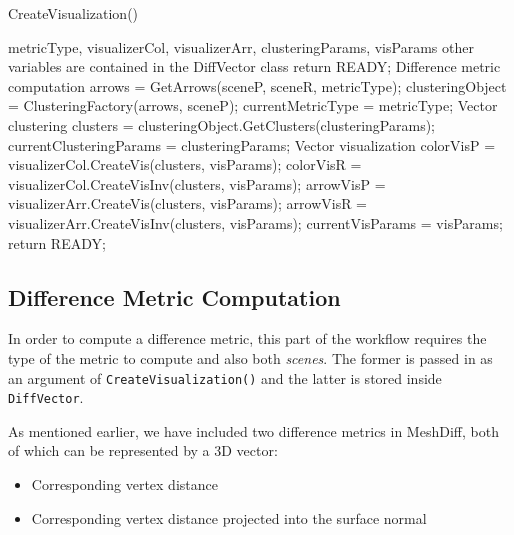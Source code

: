 \begin{algorithm}[H]
\caption{CreateVisualization()}
\label{algo:create_vis}
\begin{algorithmic}[1]

\Require metricType, visualizerCol, visualizerArr, clusteringParams, visParams \Comment other variables are contained in the DiffVector class
\Statex
{}
	\State return READY;
\EndIf
\Statex \Comment Difference metric computation
	\State arrows = GetArrows(sceneP, sceneR, metricType);
    \State clusteringObject = ClusteringFactory(arrows, sceneP);
    \State currentMetricType = metricType;
\EndIf
\Statex \Comment Vector clustering
\State clusters = clusteringObject.GetClusters(clusteringParams);
\State currentClusteringParams = clusteringParams;
\Statex \Comment Vector visualization
	\State colorVisP = visualizerCol.CreateVis(clusters, visParams);
    \State colorVisR = visualizerCol.CreateVisInv(clusters, visParams);
\EndIf
{}
	\State arrowVisP = visualizerArr.CreateVis(clusters, visParams);
    \State arrowVisR = visualizerArr.CreateVisInv(clusters, visParams);
\EndIf
\State currentVisParams = visParams;
\Statex
\State return READY;
\end{algorithmic}
\end{algorithm}

\subsection{Difference Metric Computation}
\label{sec:analysis_metric}

In order to compute a difference metric, this part of the workflow requires the type of the metric to compute and also both {\it scenes}. The former is passed in as an argument of \verb+CreateVisualization()+ and the latter is stored inside \verb+DiffVector+.

As mentioned earlier, we have included two difference metrics in MeshDiff, both of which can be represented by a 3D vector:

\begin{itemize}
\item Corresponding vertex distance
\item Corresponding vertex distance projected into the surface normal
\end{itemize}

